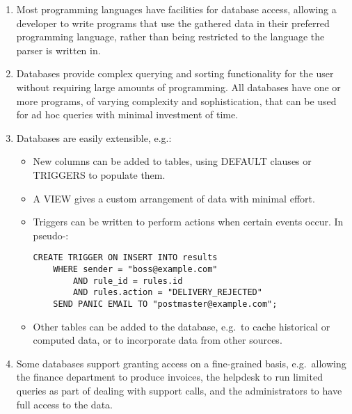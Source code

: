 \begin{enumerate}

    \item Most programming languages have facilities for database access,
        allowing a developer to write programs that use the gathered data
        in their preferred programming language, rather than being
        restricted to the language the parser is written in.

    \item Databases provide complex querying and sorting functionality for
        the user without requiring large amounts of programming.  All
        databases have one or more programs, of varying complexity and
        sophistication, that can be used for ad hoc queries with minimal
        investment of time.

    \item Databases are easily extensible, e.g.:

        \begin{itemize}

            \item New columns can be added to tables, using DEFAULT clauses
                or TRIGGERS to populate them.

            \item A VIEW gives a custom arrangement of data with minimal
                effort.

            \item Triggers can be written to perform actions when certain
                events occur.  In pseudo-\@:

\begin{verbatim}
CREATE TRIGGER ON INSERT INTO results
    WHERE sender = "boss@example.com"
        AND rule_id = rules.id
        AND rules.action = "DELIVERY_REJECTED"
    SEND PANIC EMAIL TO "postmaster@example.com";
\end{verbatim}

            \item Other tables can be added to the database, e.g.\ to cache
                historical or computed data, or to incorporate data from
                other sources.

        \end{itemize}

    \item Some databases support granting access on a fine-grained basis,
        e.g.\ allowing the finance department to produce invoices, the
        helpdesk to run limited queries as part of dealing with support
        calls, and the administrators to have full access to the data.



\end{enumerate}
